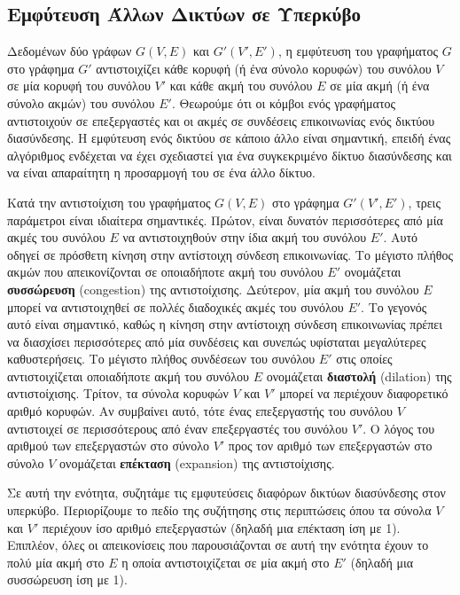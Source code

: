 \documentclass[12pt,a4paper]{article}
\begin{document}
\subsection{Εμφύτευση Άλλων Δικτύων σε Υπερκύβο}
Δεδομένων δύο γράφων $G(V,E)$ και $G'(V',E')$, η εμφύτευση του 
γραφήματος $G$ στο γράφημα $G'$ αντιστοιχίζει κάθε κορυφή (ή ένα 
σύνολο κορυφών) του συνόλου $V$ σε μία κορυφή του συνόλου $V'$ και κάθε 
ακμή του συνόλου $E$ σε μία ακμή (ή ένα σύνολο ακμών) του συνόλου $E'$.
Θεωρούμε ότι οι κόμβοι ενός γραφήματος αντιστοιχούν σε επεξεργαστές και 
οι ακμές σε συνδέσεις επικοινωνίας ενός δικτύου διασύνδεσης. Η εμφύτευση
ενός δικτύου σε κάποιο άλλο είναι σημαντική, επειδή ένας αλγόριθμος
ενδέχεται να έχει σχεδιαστεί για ένα συγκεκριμένο δίκτυο διασύνδεσης και
να είναι απαραίτητη η προσαρμογή του σε ένα άλλο δίκτυο.

Κατά την αντιστοίχιση του γραφήματος $G(V,E)$ στο γράφημα $G'(V',E')$,
τρεις παράμετροι είναι ιδιαίτερα σημαντικές. Πρώτον, είναι δυνατόν 
περισσότερες από μία ακμές του συνόλου $E$ να αντιστοιχηθούν στην ίδια 
ακμή του συνόλου $E'$. Αυτό οδηγεί σε πρόσθετη κίνηση στην αντίστοιχη 
σύνδεση επικοινωνίας. Το μέγιστο πλήθος ακμών που απεικονίζονται σε 
οποιαδήποτε ακμή του συνόλου $E'$ ονομάζεται \textbf{συσσώρευση}
(\foreignlanguage{english}{congestion}) της αντιστοίχισης. Δεύτερον, μία 
ακμή του συνόλου $E$ μπορεί να αντιστοιχηθεί σε πολλές διαδοχικές ακμές 
του συνόλου $E'$. Το γεγονός αυτό είναι σημαντικό, καθώς η κίνηση στην 
αντίστοιχη σύνδεση επικοινωνίας πρέπει να διασχίσει περισσότερες από μία 
συνδέσεις και συνεπώς υφίσταται μεγαλύτερες καθυστερήσεις. Το μέγιστο 
πλήθος συνδέσεων του συνόλου $E'$ στις οποίες αντιστοιχίζεται οποιαδήποτε 
ακμή του συνόλου $E$ ονομάζεται \textbf{διαστολή}
(\foreignlanguage{english}{dilation}) της αντιστοίχισης. Τρίτον, τα 
σύνολα κορυφών $V$ και $V'$ μπορεί να περιέχουν διαφορετικό αριθμό κορυφών. 
Αν συμβαίνει αυτό, τότε ένας επεξεργαστής του συνόλου $V$ αντιστοιχεί σε 
περισσότερους από έναν επεξεργαστές του συνόλου $V'$. Ο λόγος του αριθμού 
των επεξεργαστών στο σύνολο $V'$ προς τον αριθμό των επεξεργαστών στο 
σύνολο $V$ ονομάζεται \textbf{επέκταση}
(\foreignlanguage{english}{expansion}) της αντιστοίχισης.

Σε αυτή την ενότητα, συζητάμε τις εμφυτεύσεις διαφόρων δικτύων διασύνδεσης
στον υπερκύβο. Περιορίζουμε το πεδίο της συζήτησης στις περιπτώσεις όπου 
τα σύνολα $V$ και $V'$ περιέχουν ίσο αριθμό επεξεργαστών (δηλαδή μια 
επέκταση ίση με 1). Επιπλέον, όλες οι απεικονίσεις που παρουσιάζονται σε 
αυτή την ενότητα έχουν το πολύ μία ακμή στο $E$ η οποία αντιστοιχίζεται 
σε μία ακμή στο $E'$ (δηλαδή μια συσσώρευση ίση με 1).
\end{document}
